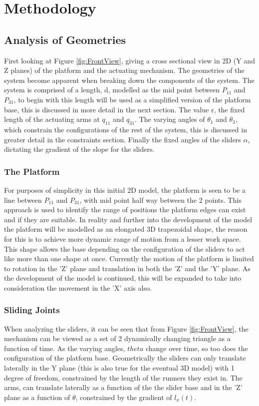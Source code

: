 

\section{Methodology}

\subsection{Analysis of Geometries}
First looking at Figure \ref{fig:FrontView}, giving a cross sectional view in 2D (Y and Z planes) of the platform and the actuating mechanism. The geometries of the system become apparent when breaking down the components of the system. The system is comprised of a length, d, modelled as the mid point between $P_{11}$ and $P_{31}$, to begin with this length will be used as a simplified version of the platform base, this is discussed in more detail in the next section. The value r, the fixed length of the actuating arms at $q_{11}$ and $q_{31}$. The varying angles of $\theta_{1}$ and $\theta_{3}$, which constrain the configurations of the rest of the system, this is discussed in greater detail in the constraints section. Finally the fixed angles of the sliders $\alpha$, dictating the gradient of the slope for the sliders.  
\subsubsection{The Platform}
For purposes of simplicity in this initial 2D model, the platform is seen to be a line between $P_{11}$ and $P_{31}$, with mid point half way between the 2 points. This approach is used to identify the range of positions the platform edges can exist and if they are suitable. In reality and further into the development of the model the platform will be modelled as an elongated 3D trapezoidal shape, the reason for this is to achieve more dynamic range of motion from a lesser work space. This shape allows the base depending on the configuration of the sliders to act like more than one shape at once. Currently the motion of the platform is limited to rotation in the 'Z' plane and translation in both the 'Z' and the 'Y' plane. As the development of the model is continued, this will be expanded to take into consideration the movement in the 'X' axis also. 
\subsubsection{Sliding Joints}
When analyzing the sliders, it can be seen that from Figure \ref{fig:FrontView}, the mechanism can be viewed as a set of 2 dynamically changing triangle as a function of time. As the varying angles, $theta$ change over time, so too does the configuration of the platform base. Geometrically the sliders can only translate laterally in the Y plane (this is also true for the eventual 3D model) with 1 degree of freedom, constrained by the length of the runners they exist in. The arms, can translate laterally as a function of the the slider base and in the 'Z' plane as a function of $\theta$, constrained by the gradient of $l_{x}(t)$. 

